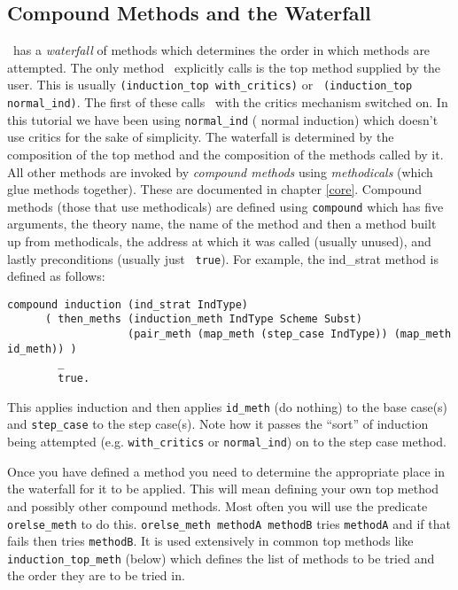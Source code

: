 \subsection{Compound Methods and the
  Waterfall} \lclam\ has a {\em waterfall} of methods
which determines the order in which methods are attempted.  The only
method \lclam\ explicitly calls is the top method supplied by the
user.  This is usually {\tt (induction\_top
  with\_critics)} or {\tt
  (induction\_top normal\_ind)}.  The first of
these calls \lclam\ with the critics mechanism switched
on.  In this tutorial we have been using {\tt normal\_ind} ( normal
induction) which doesn't use critics for the sake of simplicity.  The
waterfall is determined by the composition of the top method and the composition of the methods called by it.  All other
methods are invoked by {\em compound methods} using {\em
  methodicals} (which glue methods together).  These
are documented in chapter \ref{core}.  Compound methods (those that
use methodicals) are defined using {\tt compound}
which has five arguments, the theory name, the name of the method and
then a method built up from methodicals, the address at which it was
called (usually unused), and lastly preconditions (usually just {\tt
  true}).  For example, the ind\_strat method is
defined as follows:
\begin{verbatim}
compound induction (ind_strat IndType)
      ( then_meths (induction_meth IndType Scheme Subst)
                   (pair_meth (map_meth (step_case IndType)) (map_meth id_meth)) )
        _
        true.
\end{verbatim}

This applies induction and then applies {\tt id\_meth} 
(do nothing) to the base case(s) and {\tt step\_case}
to the step case(s).  Note how it passes the ``sort'' of induction being attempted (e.g. {\tt with\_critics} or {\tt normal\_ind}) on to the step case method.

Once you have defined a method you need to determine the appropriate
place in the waterfall for it to be applied.  This will mean defining
your own top method and possibly other compound methods.  Most often
you will use the predicate {\tt orelse\_meth} to
do this.  {\tt orelse\_meth methodA methodB} tries {\tt methodA} and
if that fails then tries {\tt methodB}.  It is used extensively in
common top methods like {\tt induction\_top\_meth} (below) which
defines the list of methods to be tried and the order they are to be
tried in.

